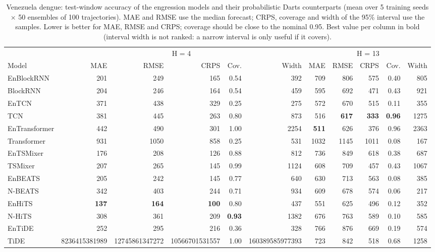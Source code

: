 \begin{table}[t]
\centering\small
\caption{Venezuela dengue: test-window accuracy of the engression models and their probabilistic Darts counterparts (mean over 5 training seeds $\times$ 50 ensembles of 100 trajectories). MAE and RMSE use the median forecast; CRPS, coverage and width of the 95\% interval use the samples. Lower is better for MAE, RMSE and CRPS; coverage should be close to the nominal 0.95. Best value per column in bold (interval width is not ranked: a narrow interval is only useful if it covers).}
\label{tab:dengue}
\begin{tabular}{lrrrrrrrrrr}
\toprule
 & \multicolumn{5}{c}{H = 4} & \multicolumn{5}{c}{H = 13} \\
\cmidrule(lr){2-6} \cmidrule(lr){7-11}
Model & MAE & RMSE & CRPS & Cov. & Width & MAE & RMSE & CRPS & Cov. & Width \\
\midrule
EnBlockRNN & 201 & 249 & 165 & 0.54 & 392 & 709 & 806 & 575 & 0.40 & 805 \\
BlockRNN & 204 & 246 & 164 & 0.54 & 459 & 595 & 692 & 471 & 0.43 & 921 \\
\addlinespace[2pt]
EnTCN & 371 & 438 & 329 & 0.25 & 275 & 572 & 670 & 515 & 0.11 & 355 \\
TCN & 381 & 445 & 263 & 0.80 & 873 & 516 & \textbf{617} & \textbf{333} & \textbf{0.96} & 1275 \\
\addlinespace[2pt]
EnTransformer & 442 & 490 & 301 & 1.00 & 2254 & \textbf{511} & 626 & 376 & 0.96 & 2363 \\
Transformer & 931 & 1050 & 858 & 0.25 & 531 & 1032 & 1145 & 1011 & 0.08 & 167 \\
\addlinespace[2pt]
EnTSMixer & 176 & 208 & 126 & 0.88 & 812 & 736 & 849 & 618 & 0.38 & 687 \\
TSMixer & 207 & 265 & 145 & 0.99 & 1124 & 608 & 709 & 457 & 0.43 & 1067 \\
\addlinespace[2pt]
EnBEATS & 205 & 242 & 145 & 0.77 & 640 & 630 & 713 & 563 & 0.08 & 385 \\
N-BEATS & 342 & 403 & 244 & 0.71 & 934 & 609 & 678 & 574 & 0.06 & 217 \\
\addlinespace[2pt]
EnHiTS & \textbf{137} & \textbf{164} & \textbf{100} & 0.80 & 437 & 551 & 625 & 496 & 0.12 & 352 \\
N-HiTS & 308 & 361 & 209 & \textbf{0.93} & 1382 & 676 & 763 & 589 & 0.10 & 585 \\
\addlinespace[2pt]
EnTiDE & 252 & 295 & 216 & 0.36 & 328 & 766 & 876 & 669 & 0.19 & 574 \\
TiDE & 8236415381989 & 12745861347272 & 10566701531557 & 1.00 & 160389585977393 & 723 & 842 & 518 & 0.68 & 1258 \\
\bottomrule
\end{tabular}
\end{table}